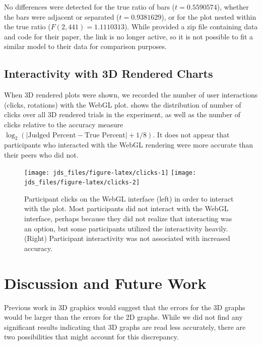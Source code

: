 \documentclass[letterpaper,inpress,dvipsnames]{jdsart}
\begin{document}
No differences were detected for the true ratio of bars (\(t = 0.5590574\)), whether the bars were adjacent or separated (\(t = 0.9381629\)), or for the plot nested within the true ratio (\(F(2, 441) = 1.1110313\)).
While \citeauthor{heerCrowdsourcingGraphicalPerception2010b} provided a zip file containing data and code for their paper, the link is no longer active, so it is not possible to fit a similar model to their data for comparison purposes.

\hypertarget{interactivity-with-3d-rendered-charts}{%
\subsection{Interactivity with 3D Rendered Charts}\label{interactivity-with-3d-rendered-charts}}

When 3D rendered plots were shown, we recorded the number of user interactions (clicks, rotations) with the WebGL plot.  shows the distribution of number of clicks over all 3D rendered trials in the experiment, as well as the number of clicks relative to the accuracy measure \(\log_2(|\text{Judged Percent} - \text{True Percent}|+1/8)\). It does not appear that participants who interacted with the WebGL rendering were more accurate than their peers who did not.

\begin{figure}
\texttt{[image: jds\_files/figure-latex/clicks-1]} \texttt{[image: jds\_files/figure-latex/clicks-2]} \caption{Participant clicks on the WebGL interface (left) in order to interact with the plot. Most participants did not interact with the WebGL interface, perhaps because they did not realize that interacting was an option, but some participants utilized the interactivity heavily. (Right) Participant interactivity was not associated with increased accuracy.}\label{fig:clicks}
\end{figure}

\hypertarget{discussion-and-future-work}{%
\section{Discussion and Future Work}\label{discussion-and-future-work}}

Previous work in 3D graphics would suggest that the errors for the 3D graphs would be larger than the errors for the 2D graphs.
While we did not find any significant results indicating that 3D graphs are read less accurately, there are two possibilities that might account for this discrepancy.
\end{document}
